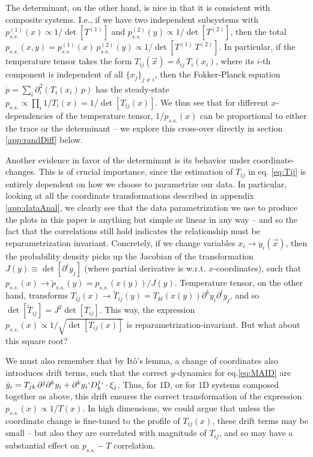 \documentclass[reprint,prx]{revtex4-1}
\renewcommand{\=}[1]{\stackrel{#1}{=}} %
\renewcommand{\(}{\left (}
\renewcommand{\)}{\right  )}
\renewcommand{\[}{\left [}
\renewcommand{\]}{\right ]}
\newcommand{\<}{\left <}
\renewcommand{\>}{\right >}
\theoremstyle{definition}
\theoremstyle{remark}
\begin{document}
The determinant, on the other hand, is nice in that it is consistent with composite systems. I.e., if we have two independent subsystems with $ p^{(1)}_{s.s.}(x) \propto 1/\det\[T^{(1)}\]$ and $ p^{(2)}_{s.s.}(y) \propto 1/\det\[T^{(2)}\]$, then the total $ p_{s.s.}(x,y)=p^{(1)}_{s.s.}(x) \, p^{(2)}_{s.s.}(y) \propto 1/\det\[T^{(1)}\,T^{(2)}\]$. In particular, if the temperature tensor takes the form $ T_{ij}(\vec{x})=\delta_{ij}\,T_i(x_i) $, where its $ i $-th component is independent of all $ \{x_j\}_{j\ne i} $, then the Fokker-Planck equation $ \dot{p} = \sum_i \partial_i^2 \(T_i(x_i)\, p\)$ has the steady-state $ p_{s.s.} \propto \prod_i 1/T_i(x) = 1/\det\[T_{ij}(x)\] $. We thus see that for different $ x $-dependencies of the temperature tensor, $ 1/p_{s.s.}(x) $ can be proportional to either the trace or the determinant -- we explore this cross-over directly in section \ref{app:randDiff} below.

Another evidence in favor of the determinant is its behavior under coordinate-changes. This is of crucial importance, since the estimation of $ T_{ij} $ in eq. \ref{eq:Tij} is entirely dependent on how we choose to parametrize our data. In particular, looking at all the coordinate transformations described in appendix \ref{app:dataAnal}, we clearly see that the data parametrization we use to produce the plots in this paper is anything but simple or linear in any way -- and so the fact that the correlations still hold indicates the relationship must be reparametrization invariant. Concretely, if we change variables $ x_i \rightarrow y_i(\vec{x}) $, then the probability density picks up the Jacobian of the transformation $J(y) \equiv \det\[\partial^i y_j\] $ (where partial derivative is w.r.t. $ x $-coordinates), such that $ p_{s.s.}(x) \rightarrow \tilde{p}_{s.s.}(y)=p_{s.s.}(x(y))/J(y)$. Temperature tensor, on the other hand, transforms $ T_{ij}(x) \rightarrow \tilde{T}_{ij}(y)=T_{kl}(x(y)) \partial^k y_i\partial^ly_j$, and so $ \det\[\tilde{T}_{ij}\] = J^2 \det\[T_{ij}\] $. This way, the expression $ p_{s.s.}(x) \propto 1/\sqrt{\det\[T_{ij}(x)\]} $ is reparametrization-invariant. But what about this square root?

We must also remember that by It\^o's lemma, a change of coordinates also introduces drift terms, such that the correct $ y $-dynamics for eq.\ref{eq:MAID} are $ \dot{y}_i = T_{jk}\,\partial^j\partial^k y_i + \partial^k y_i `D_{k}^{j}`\cdot\xi_j $. Thus, for 1D, or for 1D systems composed together as above, this drift ensures the correct transformation of the expression $ p_{s.s.}(x) \propto 1/T(x) $. In high dimensions, we could argue that unless the coordinate change is fine-tuned to the profile of $ T_{ij}(x) $, these drift terms may be small -- but also they are correlated with magnitude of $ T_{ij} $, and so may have a substantial effect on $ p_{s.s.} - T$ correlation.
\end{document}
